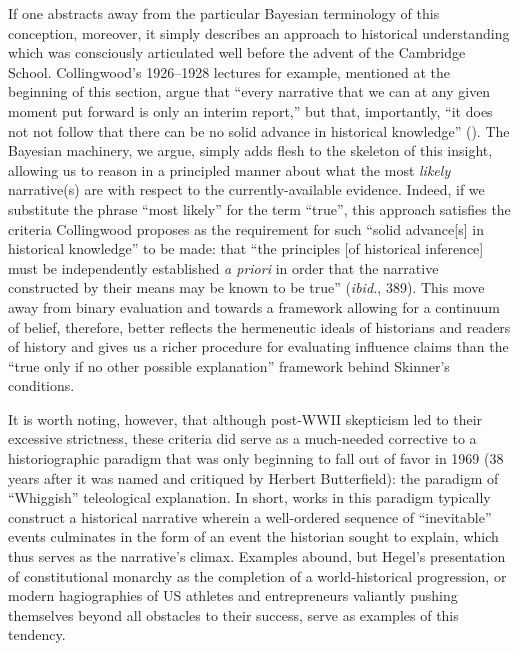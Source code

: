 \documentclass[11pt]{article}
\begin{document}
If one abstracts away from the particular Bayesian terminology of this conception, moreover, it simply describes an approach to historical understanding which was consciously articulated well before the advent of the Cambridge School. Collingwood's 1926--1928 lectures for example, mentioned at the beginning of this section, argue that ``every narrative that we can at any given moment put forward is only an interim report,'' but that, importantly, ``it does not not follow that there can be no solid advance in historical knowledge'' (\cite{collingwood_idea_1946}). The Bayesian machinery, we argue, simply adds flesh to the skeleton of this insight, allowing us to reason in a principled manner about what the most \textit{likely} narrative(s) are with respect to the currently-available evidence. Indeed, if we substitute the phrase ``most likely'' for the term ``true'', this approach satisfies the criteria Collingwood proposes as the requirement for such ``solid advance[s] in historical knowledge'' to be made: that ``the principles [of historical inference] must be independently established \textit{a priori} in order that the narrative constructed by their means may be known to be true'' (\textit{ibid.}, 389).
This move away from binary evaluation and towards a framework allowing for a continuum of belief, therefore, better reflects the hermeneutic ideals of historians and readers of history and gives us a richer procedure for evaluating influence claims than the ``true only if no other possible explanation'' framework behind Skinner's conditions.

It is worth noting, however, that although post-WWII skepticism led to their excessive strictness, these criteria did serve as a much-needed corrective to a historiographic paradigm that was only beginning to fall out of favor in 1969 (38 years after it was named and critiqued by Herbert Butterfield): the paradigm of ``Whiggish'' teleological explanation. In short, works in this paradigm typically construct a historical narrative wherein a well-ordered sequence of ``inevitable'' events culminates in the form of an event the historian sought to explain, which thus serves as the narrative's climax.
Examples abound, but Hegel's presentation of constitutional monarchy as the completion of a world-historical progression, or modern hagiographies of US athletes and entrepreneurs valiantly pushing themselves beyond all obstacles to their success, serve as examples of this tendency.
\end{document}
